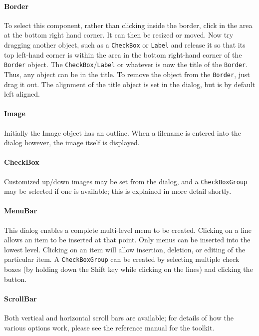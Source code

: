 \paragraph{Border}
To select this component, rather than
clicking inside the border, click in the area at the bottom right hand
corner. It can then be resized or moved. Now try dragging another
object, such as a \texttt{CheckBox} or \texttt{Label} and release it so
that its top left-hand corner is within the area in the bottom
right-hand corner of the \texttt{Border} object. The
\texttt{CheckBox}/\texttt{Label} or whatever is now the title of the
\texttt{Border}. Thus, any object can be in the title. To remove the
object from the \texttt{Border}, just drag it out. The alignment of the
title object is set in the dialog, but is by default left aligned.

\paragraph{Image}
Initially the Image object has an outline. When a filename is entered
into the dialog however, the image itself is displayed.

\paragraph{CheckBox}
Customized up/down images may be set from the dialog, and a
\texttt{CheckBoxGroup} may be selected if one is available; this is
explained in more detail shortly.

\paragraph{MenuBar}
This dialog enables a complete multi-level menu to be
created. Clicking on a line allows an item to be inserted at that
point. Only menus can be inserted into the lowest level.
Clicking on an item will allow insertion, deletion, or editing of the
particular item. A \texttt{CheckBoxGroup} can be created by selecting
multiple check boxes (by holding down the Shift key while clicking on
the lines) and clicking the button.

\paragraph{ScrollBar}
Both vertical and horizontal scroll bars are available; for details of
how the various options work, please see the reference
manual for the toolkit.

